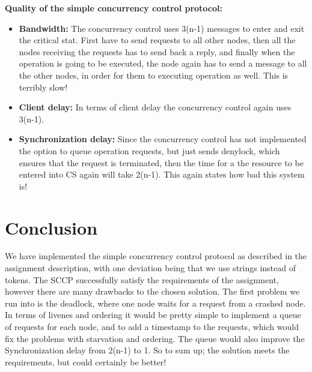 \textbf{Quality of the simple concurrency control protocol:}
\begin{itemize}
\item \textbf{Bandwidth:} The concurrency control uses 3(n-1) messages to enter and exit the critical stat. First have to send requests to all other nodes, then all the nodes receiving the requests has to send back a reply, and finally when the operation is going to be executed, the node again has to send a message to all the other nodes, in order for them to executing operation as well. This is terribly slow!
\item \textbf{Client delay:} In terms of client delay the concurrency control again uses 3(n-1).
\item \textbf{Synchronization delay:} Since the concurrency control has not implemented the option to queue operation requests, but just sends denylock, which ensures that the request is terminated, then the time for a the resource to be entered into CS again will take 2(n-1). This again states how bad this system is!
\end{itemize}

\section{Conclusion}
\label{MutualExclusion_conclusion}
We have implemented the simple concurrency control protocol as described in the assignment description, with one deviation being that we use strings instead of tokens. The SCCP successfully satisfy the requirements of the assignment, however there are many drawbacks to the chosen solution. The first problem we run into is the deadlock, where one node waits for a request from a crashed node. In terms of livenes and ordering it would be pretty simple to implement a queue of requests for each node, and to add a timestamp to the requests, which would fix the problems with starvation and ordering. The queue would also improve the Synchronization delay from 2(n-1) to 1.
So to sum up; the solution meets the requirements, but could certainly be better!
